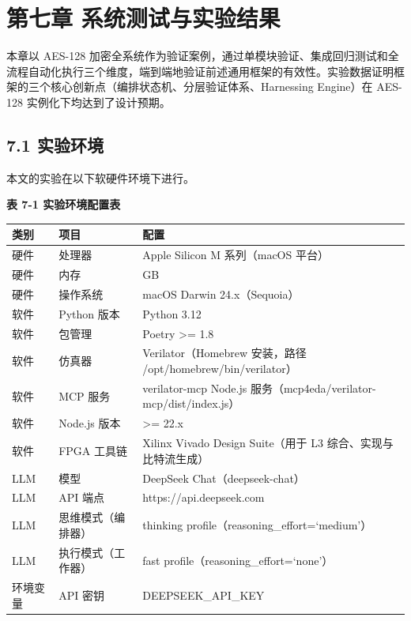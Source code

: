 \section{第七章
系统测试与实验结果}\label{ux7b2cux4e03ux7ae0-ux7cfbux7edfux6d4bux8bd5ux4e0eux5b9eux9a8cux7ed3ux679c}

本章以 AES-128
加密全系统作为验证案例，通过单模块验证、集成回归测试和全流程自动化执行三个维度，端到端地验证前述通用框架的有效性。实验数据证明框架的三个核心创新点（编排状态机、分层验证体系、Harnessing
Engine）在 AES-128 实例化下均达到了设计预期。

\subsection{7.1 实验环境}\label{ux5b9eux9a8cux73afux5883}

本文的实验在以下软硬件环境下进行。

\textbf{表 7-1 实验环境配置表}

{\def\LTcaptype{none} %
\begin{longtable}[]{@{}
  >{\raggedright\arraybackslash}p{}
  >{\raggedright\arraybackslash}p{}
  >{\raggedright\arraybackslash}p{}@{}}
\toprule\noalign{}
\begin{minipage}[b]{\linewidth}\raggedright
类别
\end{minipage} & \begin{minipage}[b]{\linewidth}\raggedright
项目
\end{minipage} & \begin{minipage}[b]{\linewidth}\raggedright
配置
\end{minipage} \\
\midrule\noalign{}
\endhead
\bottomrule\noalign{}
\endlastfoot
硬件 & 处理器 & Apple Silicon M 系列（macOS 平台） \\
硬件 & 内存 & 16 GB \\
硬件 & 操作系统 & macOS Darwin 24.x（Sequoia） \\
软件 & Python 版本 & Python 3.12 \\
软件 & 包管理 & Poetry \textgreater= 1.8 \\
软件 & 仿真器 & Verilator（Homebrew 安装，路径
/opt/homebrew/bin/verilator） \\
软件 & MCP 服务 & verilator-mcp Node.js
服务（mcp4eda/verilator-mcp/dist/index.js） \\
软件 & Node.js 版本 & \textgreater= 22.x \\
软件 & FPGA 工具链 & Xilinx Vivado Design Suite（用于 L3 综合、实现与比特流生成） \\
LLM & 模型 & DeepSeek Chat（deepseek-chat） \\
LLM & API 端点 & https://api.deepseek.com \\
LLM & 思维模式（编排器） & thinking
profile（reasoning\_effort=`medium'） \\
LLM & 执行模式（工作器） & fast profile（reasoning\_effort=`none'） \\
环境变量 & API 密钥 & DEEPSEEK\_API\_KEY \\
\end{longtable}
}

